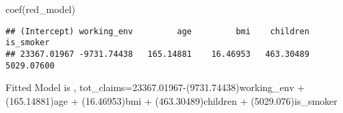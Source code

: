 \documentclass[
]{article}
\newenvironment{Shaded}{\begin{snugshade}}{\end{snugshade}}
\newcommand{\FunctionTok}[1]{\textcolor[rgb]{0.00,0.00,0.00}{#1}}
\newcommand{\NormalTok}[1]{#1}
\begin{document}
\begin{Shaded}
\begin{Highlighting}[]
\FunctionTok{coef}\NormalTok{(red\_model)}
\end{Highlighting}
\end{Shaded}

\begin{verbatim}
## (Intercept) working_env         age         bmi    children   is_smoker 
## 23367.01967 -9731.74438   165.14881    16.46953   463.30489  5029.07600
\end{verbatim}

Fitted Model is , tot\_claims=23367.01967-(9731.74438)working\_env +
(165.14881)age + (16.46953)bmi + (463.30489)children +
(5029.076)is\_smoker
\end{document}
